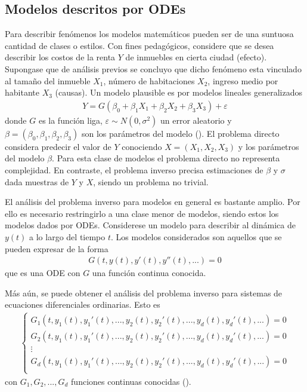 \subsection*{Modelos descritos por ODEs}

Para describir fenómenos los modelos matemáticos pueden ser de una suntuosa cantidad de clases o estilos. Con fines pedagógicos, considere que se desea describir los costos de la renta $Y$ de inmuebles en cierta ciudad (efecto). Supongase que de análisis previos se concluyo que dicho fenómeno esta vinculado al tamaño del inmueble $X_1$, número de habitaciones $X_2$, ingreso medio por habitante $X_3$ (causas). Un modelo plausible es por modelos lineales generalizados
\begin{align}
    Y = G(\beta_0 + \beta_1 X_1 + \beta_2 X_2 + \beta_3 X_3) + \varepsilon
    \label{2.1.1.01}
\end{align}
donde $G$ es la función liga, $\varepsilon \sim N(0,\sigma^2)$ un error aleatorio y $\beta = (\beta_0, \beta_1, \beta_2, \beta_3)$ son los parámetros del modelo (\cite{dobson2018introduction}). El problema directo considera predecir el valor de $Y$ conociendo $X = (X_1,X_2,X_3)$ y los parámetros del modelo $\beta$. Para esta clase de modelos el problema directo no representa complejidad. En contraste, el problema inverso precisa estimaciones de $\beta$  y $\sigma$ dada muestras de $Y$ y $X$, siendo un problema no trivial. 

El análisis del problema inverso para modelos en general es bastante amplio. Por ello es necesario restringirlo a una clase menor de modelos, siendo estos los modelos dados por ODEs. Considerese un modelo para describir al dinámica de $y(t)$ a lo largo del tiempo $t$. Los modelos considerados son aquellos que se pueden expresar de la forma
\begin{align*}
    G(t,y(t),y'(t),y''(t),...) = 0
\end{align*}
que es una ODE con $G$ una función continua conocida.

Más aún, se puede obtener el análisis del problema inverso para sistemas de ecuaciones diferenciales ordinarias. Esto es
\begin{align*}
    \left\{
        \begin{matrix}
        G_1(t,y_1(t),y_1'(t),...,y_2(t),y_2'(t),..., y_d(t),y_d'(t),...)=0\\
        G_2(t,y_1(t),y_1'(t),...,y_2(t),y_2'(t),..., y_d(t),y_d'(t),...)=0\\
        \vdots
        \\ 
        G_d(t,y_1(t),y_1'(t),...,y_2(t),y_2'(t),..., y_d(t),y_d'(t),...)=0\\
       \end{matrix}
    \right.
\end{align*}
con $G_1, G_2, ..., G_d$ funciones continuas conocidas (\cite{zill2002ecuaciones}).

